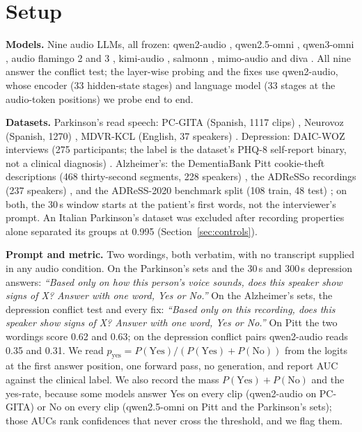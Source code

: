 \documentclass{article}
\begin{document}
\section{Setup}\label{sec:setup}

\noindent\textbf{Models.} Nine audio LLMs, all frozen: qwen2-audio \cite{qwen2audio},
qwen2.5-omni \cite{qwen25omni}, qwen3-omni \cite{qwen3omni}, audio flamingo 2 and 3
\cite{af2,af3}, kimi-audio \cite{kimiaudio}, salmonn \cite{salmonn}, mimo-audio
\cite{mimoaudio} and diva \cite{diva}. All nine answer the conflict test; the layer-wise probing and
the fixes use qwen2-audio, whose encoder (33 hidden-state stages) and language model (33 stages at
the audio-token positions) we probe end to end.

\noindent\textbf{Datasets.} Parkinson's read speech: PC-GITA (Spanish, 1117 clips)
\cite{pcgita}, Neurovoz (Spanish, 1270) \cite{neurovoz}, MDVR-KCL (English, 37 speakers)
\cite{kcl}. Depression: DAIC-WOZ interviews (275 participants; the label is the dataset's PHQ-8
self-report binary, not a clinical diagnosis) \cite{daic}. Alzheimer's: the
DementiaBank Pitt cookie-theft descriptions (468 thirty-second segments, 228 speakers)
\cite{pitt,dementiabank}, the ADReSSo recordings (237 speakers) \cite{adresso}, and the ADReSS-2020
benchmark split (108 train, 48 test) \cite{adress2020}; on both, the 30\,s window starts at the
patient's first words, not the interviewer's prompt. An Italian Parkinson's dataset was excluded
after recording properties alone separated its groups at 0.995 (Section~\ref{sec:controls}).

\noindent\textbf{Prompt and metric.} Two wordings, both verbatim, with no transcript supplied in any
audio condition. On the Parkinson's sets and the 30\,s and 300\,s depression answers: \emph{``Based
only on how this person's voice sounds, does this speaker show signs of X? Answer with one word, Yes or
No.''} On the Alzheimer's sets, the depression conflict test and every fix: \emph{``Based only on this
recording, does this speaker show signs of X? Answer with one word, Yes or No.''} On Pitt the two
wordings score 0.62 and 0.63; on the depression conflict pairs qwen2-audio reads 0.35 and 0.31. We read $p_{\text{yes}} = P(\text{Yes})/(P(\text{Yes})+P(\text{No}))$ from the logits
at the first answer position, one forward pass, no generation, and report AUC against the clinical
label. We also record the mass $P(\text{Yes})+P(\text{No})$ and the yes-rate, because some models
answer Yes on every clip (qwen2-audio on PC-GITA) or No on every clip (qwen2.5-omni on Pitt and the Parkinson's sets); those AUCs
rank confidences that never cross the threshold, and we flag them.
\end{document}
